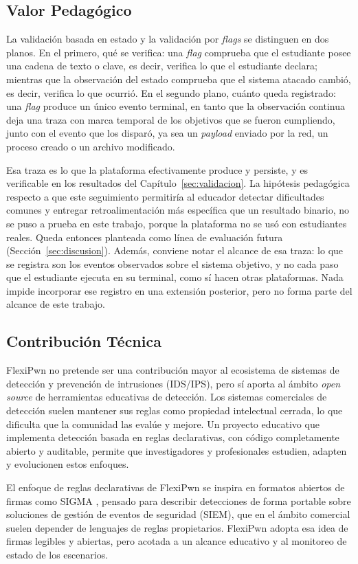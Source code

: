 \subsection{Valor Pedagógico}

La validación basada en estado y la validación por \textit{flags} se distinguen
en dos planos. En el primero, qué se verifica: una \textit{flag} comprueba que
el estudiante posee una cadena de texto o clave, es decir, verifica lo que el estudiante
declara; mientras que la observación del estado comprueba que el sistema atacado cambió, es
decir, verifica lo que ocurrió. En el segundo plano, cuánto queda registrado: una
\textit{flag} produce un único evento terminal, en tanto que la observación
continua deja una traza con marca temporal de los objetivos que se fueron cumpliendo,
junto con el evento que los disparó, ya sea un \textit{payload} enviado por la
red, un proceso creado o un archivo modificado.

Esa traza es lo que la plataforma efectivamente produce y persiste, y es
verificable en los resultados del Capítulo~\ref{sec:validacion}. La hipótesis
pedagógica respecto a que este seguimiento permitiría al educador
detectar dificultades comunes y entregar retroalimentación más específica que
un resultado binario, no se puso a prueba en este trabajo, porque la plataforma
no se usó con estudiantes reales. Queda entonces planteada como línea de evaluación
futura (Sección~\ref{sec:discusion}). Además, conviene notar el alcance de esa
traza: lo que se registra son los eventos observados sobre el sistema objetivo,
y no cada paso que el estudiante ejecuta en su terminal, como sí hacen otras
plataformas. Nada impide incorporar ese registro en una extensión posterior,
pero no forma parte del alcance de este trabajo.

\subsection{Contribución Técnica}

FlexiPwn no pretende ser una contribución mayor al ecosistema de sistemas de
detección y prevención de intrusiones (IDS/IPS), pero sí aporta al ámbito
\textit{open source} de herramientas educativas de detección. Los sistemas
comerciales de detección suelen mantener sus reglas como propiedad intelectual
cerrada, lo que dificulta que la comunidad las evalúe y mejore. Un proyecto
educativo que implementa detección basada en reglas declarativas, con código
completamente abierto y auditable, permite que investigadores y profesionales
estudien, adapten y evolucionen estos enfoques.

El enfoque de reglas declarativas de FlexiPwn se inspira en formatos abiertos de
firmas como SIGMA \cite{sigma}, pensado para describir detecciones de forma
portable sobre soluciones de gestión de eventos de seguridad (SIEM), que en el
ámbito comercial suelen depender de lenguajes de reglas propietarios. FlexiPwn
adopta esa idea de firmas legibles y abiertas, pero acotada a un alcance
educativo y al monitoreo de estado de los escenarios.
